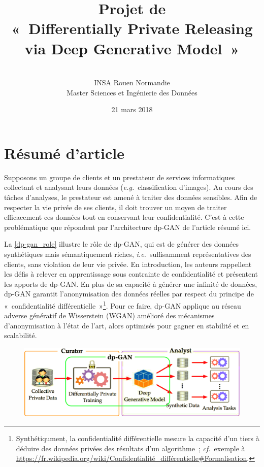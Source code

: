 \documentclass[a4paper,11pt,twoside]{article}
\title{\textbf{Projet de \DL}\\«~Differentially Private Releasing via Deep Generative Model~»}
\author{\textbf{\AH}\\INSA Rouen Normandie\\Master Sciences et Ingénierie des Données}
\date{21 mars 2018}
\theoremstyle{definition}
\newcommand{\eg}{\textit{e.g.}}
\newcommand{\ie}{\textit{i.e.}}
\newcommand{\cf}{\textit{cf.}}
\begin{document}
\maketitle
\thispagestyle{empty}

\part{Résumé d'article}
\label{resume}

Supposons un groupe de clients et un prestateur de services informatiques collectant et analysant leurs données (\eg\ classification d'images). Au cours des tâches d'analyses, le prestateur est amené à traiter des données sensibles. Afin de respecter la vie privée de ses clients, il doit trouver un moyen de traiter efficacement ces données tout en conservant leur confidentialité. C'est à cette problématique que répondent \citet{dpgan} par l'architecture dp-GAN de l'article résumé ici.

La \autoref{dp-gan_role} illustre le rôle de dp-GAN, qui est de générer des données synthétiques mais sémantiquement riches, \ie\ suffisamment représentatives des clients, sans violation de leur vie privée.
En introduction, les auteurs rappellent les défis à relever en apprentissage sous contrainte de confidentialité et présentent les apports de dp-GAN. En plus de sa capacité à générer une infinité de données, dp-GAN garantit l'anonymisation des données réelles par respect du principe de « confidentialité différentielle »\footnote{Synthétiqument, la confidentialité différentielle mesure la capacité d'un tiers à déduire des données privées des résultats d'un algorithme ; \cf\ exemple à \url{https://fr.wikipedia.org/wiki/Confidentialité_différentielle#Formalisation}.}.
Pour ce faire, dp-GAN applique au réseau adverse génératif de Wisserstein (WGAN) amélioré des mécanismes d'anonymisation à l'état de l'art, alors optimisés pour gagner en stabilité et en scalabilité.

\begin{figure}
    \centering
    \includegraphics[width=12cm]{dp-gan_role.png}
    \label{dp-gan_role}
\end{figure}
\end{document}
